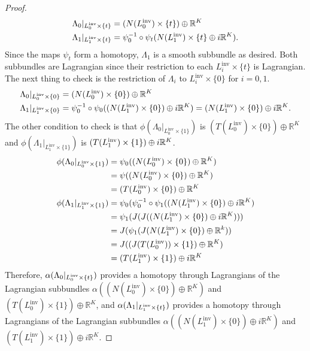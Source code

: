 \documentclass[11pt]{amsart}
\theoremstyle{definition}
\theoremstyle{remark}
\def\R{\mathbb{R}}
\newcommand{\Lo}{L_0^{\operatorname{inv}}}
\newcommand{\Li}{L_1^{\operatorname{inv}}}
\numberwithin{equation}{section}
\begin{document}
\begin{proof}
%
%
\begin{align*}
\Lambda_0|_{\smash{\Lo} \times \{t\}} &= (N(\smash{\Lo}) \times \{t\}) \oplus \mathbb R^K \\
\Lambda_1|_{\smash{\Li} \times \{t\}} &= \psi_0^{-1} \circ \psi_t(N(\smash{\Li}) \times \{t\} \oplus i \mathbb R^K).
\end{align*}
Since the maps $\psi_t$ form a homotopy, $\Lambda_1$ is a smooth subbundle as desired. Both subbundles are Lagrangian since their restriction to each $L_i^{\textrm{inv}} \times \{t\}$ is Lagrangian.    The next thing to check is the restriction of $\Lambda_i$ to $L^{\textrm{inv}}_i \times \{0\}$ for $i=0,1$.
%
\begin{align*}
\Lambda_0|_{\smash{\Lo} \times \{0\}} &= (N(\smash{\Lo}) \times \{0\}) \oplus \mathbb R^K \\
\Lambda_1|_{\smash{\Li} \times \{0\}} &= \psi_0^{-1} \circ \psi_0((N(\smash{\Li}) \times \{0\}) \oplus i\mathbb R^K)
= (N(\smash{\Li}) \times \{0\}) \oplus i \mathbb R^K.
\end{align*}
The other condition to check is that $\phi(\Lambda_0|_{L^{\textrm{inv}}_0 \times \{1\}})$ is $(T(\Lo)\times\{0\})\oplus \R^K$ and $\phi(\Lambda_1|_{L^{\textrm{inv}}_1 \times \{1\}})$ is $(T(\smash{\Li}) \times \{1\}) \oplus i\mathbb R^K$.
%
\begin{align*}
\phi(\Lambda_0|_{\smash{\Lo} \times \{1\}}) &= \psi_0((N(\smash{\Lo}) \times \{0\}) \oplus \mathbb R^K) \\
&= \psi((N(\smash{\Lo}) \times \{0\}) \oplus \mathbb R^K) \\
&=  (T(\Lo)\times\{0\})\oplus \R^K\\
\phi(\Lambda_1|_{\smash{\Li} \times \{1\}}) &= \psi_0( \psi_0^{-1} \circ \psi_1((N(\smash{\Li}) \times \{0\}) \oplus i\mathbb R^K) \\
&= \psi_1(J(J((N(\smash{\Li}) \times \{0\}) \oplus i \mathbb R^K)))	\\
&=J(\psi_1(J(N(\smash{\Li}	) \times \{0\}) \oplus \mathbb R^k))	\\								
&= J((J(T(\smash{\Lo})) \times \{1\}) \oplus \mathbb R^K)\\
&= (T(\smash{\Li}) \times \{1\}) \oplus i\mathbb R^K
\end{align*}
%
Therefore, $\alpha(\Lambda_0|_{\smash{\Lo} \times \{t\}})$ provides a homotopy through Lagrangians of the Lagrangian subbundles $\alpha((N(\Lo)\times\{0\})\oplus \R^K)$ and $(T(\Lo)\times\{1\})\oplus \R^K$, and $\alpha(\Lambda_1|_{\smash{\Li} \times \{t\}})$ provides a homotopy through Lagrangians of the Lagrangian subbundles $\alpha((N(\Li)\times\{0\})\oplus i\R^K)$ and $(T(\Li)\times\{1\})\oplus i\R^K$.\end{proof}
\end{document}
